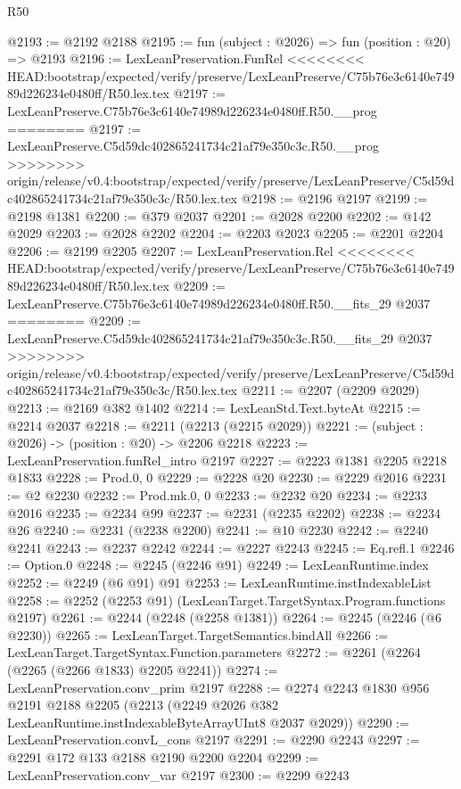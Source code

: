 \begin{lexlean}{R50}
\begin{coremodule}
{{{{{{{{{{{{{{{{{{{{{{{{{{{{{{{{{{{{{{{{{{{{{{{{{{{{{{{{{{{{@2193 := @2192 @2188
@2195 := fun (subject : @2026) => fun (position : @20) => @2193
@2196 := LexLeanPreservation.FunRel
<<<<<<<< HEAD:bootstrap/expected/verify/preserve/LexLeanPreserve/C75b76e3c6140e74989d226234e0480ff/R50.lex.tex
@2197 := LexLeanPreserve.C75b76e3c6140e74989d226234e0480ff.R50.__prog
========
@2197 := LexLeanPreserve.C5d59dc402865241734c21af79e350c3c.R50.__prog
>>>>>>>> origin/release/v0.4:bootstrap/expected/verify/preserve/LexLeanPreserve/C5d59dc402865241734c21af79e350c3c/R50.lex.tex
@2198 := @2196 @2197
@2199 := @2198 @1381
@2200 := @379 @2037
@2201 := @2028 @2200
@2202 := @142 @2029
@2203 := @2028 @2202
@2204 := @2203 @2023
@2205 := @2201 @2204
@2206 := @2199 @2205
@2207 := LexLeanPreservation.Rel
<<<<<<<< HEAD:bootstrap/expected/verify/preserve/LexLeanPreserve/C75b76e3c6140e74989d226234e0480ff/R50.lex.tex
@2209 := LexLeanPreserve.C75b76e3c6140e74989d226234e0480ff.R50.__fits_29 @2037
========
@2209 := LexLeanPreserve.C5d59dc402865241734c21af79e350c3c.R50.__fits_29 @2037
>>>>>>>> origin/release/v0.4:bootstrap/expected/verify/preserve/LexLeanPreserve/C5d59dc402865241734c21af79e350c3c/R50.lex.tex
@2211 := @2207 (@2209 @2029)
@2213 := @2169 @382 @1402
@2214 := LexLeanStd.Text.byteAt
@2215 := @2214 @2037
@2218 := @2211 (@2213 (@2215 @2029))
@2221 := (subject : @2026) -> (position : @20) -> @2206 @2218
@2223 := LexLeanPreservation.funRel_intro @2197
@2227 := @2223 @1381 @2205 @2218 @1833
@2228 := Prod.{0, 0}
@2229 := @2228 @20
@2230 := @2229 @2016
@2231 := @2 @2230
@2232 := Prod.mk.{0, 0}
@2233 := @2232 @20
@2234 := @2233 @2016
@2235 := @2234 @99
@2237 := @2231 (@2235 @2202)
@2238 := @2234 @26
@2240 := @2231 (@2238 @2200)
@2241 := @10 @2230
@2242 := @2240 @2241
@2243 := @2237 @2242
@2244 := @2227 @2243
@2245 := Eq.refl.{1}
@2246 := Option.{0}
@2248 := @2245 (@2246 @91)
@2249 := LexLeanRuntime.index
@2252 := @2249 (@6 @91) @91
@2253 := LexLeanRuntime.instIndexableList
@2258 := @2252 (@2253 @91) (LexLeanTarget.TargetSyntax.Program.functions @2197)
@2261 := @2244 (@2248 (@2258 @1381))
@2264 := @2245 (@2246 (@6 @2230))
@2265 := LexLeanTarget.TargetSemantics.bindAll
@2266 := LexLeanTarget.TargetSyntax.Function.parameters
@2272 := @2261 (@2264 (@2265 (@2266 @1833) @2205 @2241))
@2274 := LexLeanPreservation.conv_prim @2197
@2288 := @2274
    @2243
    @1830
    @956
    @2191
    @2188
    @2205
    (@2213 (@2249 @2026 @382 LexLeanRuntime.instIndexableByteArrayUInt8 @2037 @2029))
@2290 := LexLeanPreservation.convL_cons @2197
@2291 := @2290 @2243
@2297 := @2291 @172 @133 @2188 @2190 @2200 @2204
@2299 := LexLeanPreservation.conv_var @2197
@2300 := @2299 @2243
}}}}}}}}}}}}}}}}}}}}}}}}}}}}}}}}}}}}}}}}}}}}}}}}}}}}}}}}}}}}
\end{coremodule}
\end{lexlean}
